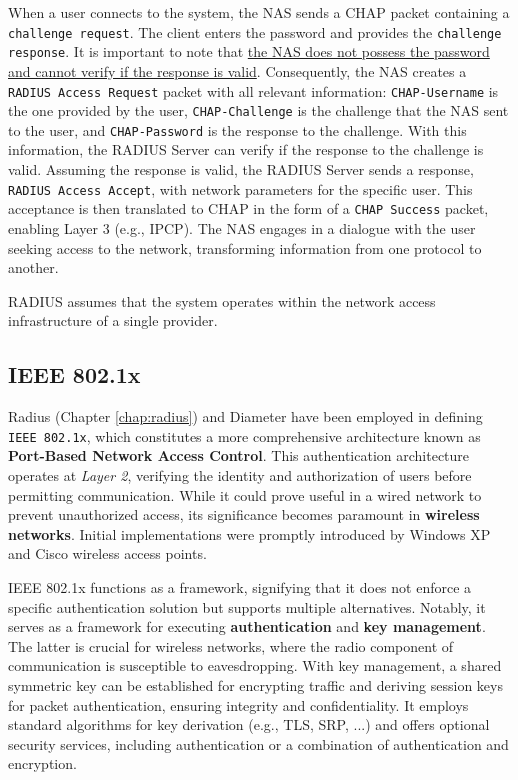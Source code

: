 When a user connects to the system, the NAS sends a CHAP packet containing a \texttt{challenge request}. The client enters the password and provides the \texttt{challenge response}. It is important to note that \underline{the NAS does not possess the password and cannot verify if the response is valid}. Consequently, the NAS creates a \texttt{RADIUS Access Request} packet with all relevant information: \texttt{CHAP-Username} is the one provided by the user, \texttt{CHAP-Challenge} is the challenge that the NAS sent to the user, and \texttt{CHAP-Password} is the response to the challenge. With this information, the RADIUS Server can verify if the response to the challenge is valid. Assuming the response is valid, the RADIUS Server sends a response, \texttt{RADIUS Access Accept}, with network parameters for the specific user. This acceptance is then translated to CHAP in the form of a \texttt{CHAP Success} packet, enabling Layer 3 (e.g., IPCP).
The NAS engages in a dialogue with the user seeking access to the network, transforming information from one protocol to another.

RADIUS assumes that the system operates within the network access infrastructure of a single provider.


\subsection{IEEE 802.1x}\label{chap:802.1x}
Radius (Chapter \ref{chap:radius}) and Diameter have been employed in defining \texttt{IEEE 802.1x},
which constitutes a more comprehensive architecture known as \textbf{Port-Based Network Access Control}.
This authentication architecture operates at \textit{Layer 2}, verifying the identity and authorization of users before permitting communication. While it could prove useful in a wired network to prevent unauthorized access, its significance becomes paramount in \textbf{wireless networks}.
Initial implementations were promptly introduced by Windows XP and Cisco wireless access points.

IEEE 802.1x functions as a framework, signifying that it does not enforce a specific authentication solution but supports multiple alternatives. Notably, it serves as a framework for executing \textbf{authentication} and \textbf{key management}. The latter is crucial for wireless networks, where the radio component of communication is susceptible to eavesdropping. With key management, a shared symmetric key can be established for encrypting traffic and deriving session keys for packet authentication, ensuring integrity and confidentiality. It employs standard algorithms for key derivation (e.g., TLS, SRP, ...) and offers optional security services, including authentication or a combination of authentication and encryption.

